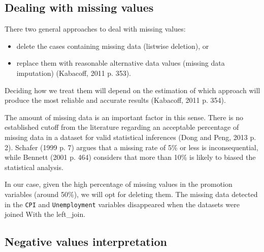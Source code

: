 \documentclass[11pt,]{article}
\newenvironment{Shaded}{\begin{snugshade}}{\end{snugshade}}
\newcommand{\StringTok}[1]{\textcolor[rgb]{0.31,0.60,0.02}{{#1}}}
\newcommand{\CommentTok}[1]{\textcolor[rgb]{0.56,0.35,0.01}{\textit{{#1}}}}
\newcommand{\OtherTok}[1]{\textcolor[rgb]{0.56,0.35,0.01}{{#1}}}
\newcommand{\NormalTok}[1]{{#1}}
\begin{document}
\subsection{Dealing with missing
values}\label{dealing-with-missing-values}

There two general approaches to deal with missing values:

\begin{itemize}
\item
  delete the cases containing missing data (listwise deletion), or
\item
  replace them with reasonable alternative data values (missing data
  imputation) (Kabacoff, 2011 p. 353).
\end{itemize}

Deciding how we treat them will depend on the estimation of which
approach will produce the most reliable and accurate results (Kabacoff,
2011 p. 354).

The amount of missing data is an important factor in this sense. There
is no established cutoff from the literature regarding an acceptable
percentage of missing data in a dataset for valid statistical inferences
(Dong and Peng, 2013 p. 2). Schafer (1999 p. 7) argues that a missing
rate of 5\% or less is inconsequential, while Bennett (2001 p. 464)
considers that more than 10\% is likely to biased the statistical
analysis.

In our case, given the high percentage of missing values in the
promotion variables (around 50\%), we will opt for deleting them. The
missing data detected in the \texttt{CPI} and \texttt{Unemployment}
variables disappeared when the datasets were joined With the left\_join.

\begin{Shaded}
\end{Shaded}

\subsection{Negative values
interpretation}\label{negative-values-interpretation}
\end{document}
